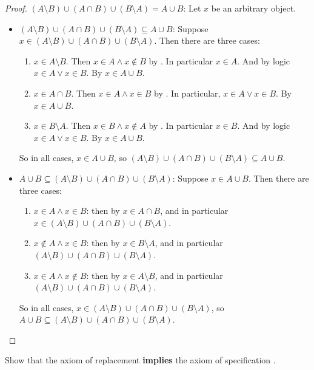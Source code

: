 \begin{proof}
\((A \setminus B) \cup (A \cap B) \cup (B \setminus A) = A \cup B\): Let \(x\) be an arbitrary object.
\begin{itemize}
    \item \((A \setminus B) \cup (A \cap B) \cup (B \setminus A) \subseteq A \cup B\): Suppose \(x \in (A \setminus B) \cup (A \cap B) \cup (B \setminus A)\). Then there are three cases:
        \begin{enumerate}
            \item \(x \in A \setminus B\). Then \(x \in A \land x \notin B\) by . In particular \(x \in A\). And by logic \(x \in A \lor x \in B\). By  \(x \in A \cup B\).
            \item \(x \in A \cap B\). Then \(x \in A \land x \in B\) by . In particular, \(x \in A \lor x \in B\). By  \(x \in A \cup B\).
            \item \(x \in B \setminus A\). Then \(x \in B \land x \notin A\) by . In particular \(x \in B\). And by logic \(x \in A \lor x \in B\). By  \(x \in A \cup B\).
        \end{enumerate}
        So in all cases, \(x \in A \cup B\), so \((A \setminus B) \cup (A \cap B) \cup (B \setminus A) \subseteq A \cup B\).
    \item \(A \cup B \subseteq (A \setminus B) \cup (A \cap B) \cup (B \setminus A)\): Suppose \(x \in A \cup B\). Then there are three cases:
        \begin{enumerate}
            \item \(x \in A \land x \in B\): then by  \(x \in A \cap B\), and in particular \(x \in (A \setminus B) \cup (A \cap B) \cup (B \setminus A)\).
            \item \(x \notin A \land x \in B\): then by  \(x \in B \setminus A\), and in particular \((A \setminus B) \cup (A \cap B) \cup (B \setminus A)\).
            \item \(x \in A \land x \notin B\): then by  \(x \in A \setminus B\), and in particular \((A \setminus B) \cup (A \cap B) \cup (B \setminus A)\).
        \end{enumerate}
        So in all cases, \(x \in (A \setminus B) \cup (A \cap B) \cup (B \setminus A)\), so \(A \cup B \subseteq (A \setminus B) \cup (A \cap B) \cup (B \setminus A)\).
\end{itemize}
\end{proof}

\begin{exercise}\label{exercise 3.1.11}
Show that the axiom of replacement  \textbf{implies} the axiom of specification .
\end{exercise}

